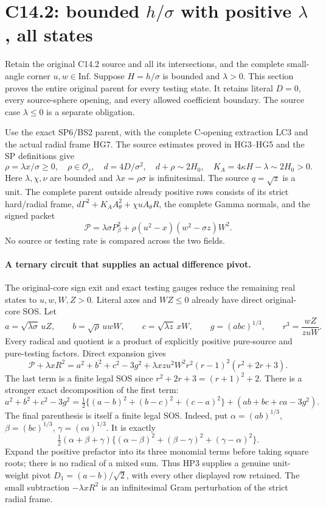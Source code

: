 \section{\texorpdfstring{C14.2: bounded $h/\sigma$ with positive $\lambda$, all states}{C14.2: bounded h/sigma with positive lambda, all states}}
\label{component:p021ed4a9e0db}

\label{p021ed4a9e0db:sec:r19-c142-positive-lambda}

Retain the original C14.2 source and all its intersections, and the
complete small-angle corner $u,w\in\mathrm{Inf}$.  Suppose
$H=h/\sigma$ is bounded and $\lambda>0$.  This section proves the
entire original parent for every testing state.  It retains literal
$D=0$, every source-sphere opening, and every allowed coefficient
boundary.  The source case $\lambda\le0$ is a separate obligation.

Use the exact SP6/BS2 parent, with the complete C-opening extraction
LC3 and the actual radial frame HG7.  The source estimates proved
in HG3--HG5 and the SP definitions give
\[
 \rho=\lambda x/\sigma\ge0,\quad \rho\in\mathcal O_c,
 \quad d=4D/\sigma^2,\quad
 d+\rho\sim2H_0,
 \quad K_A=4\kappa H-\lambda\sim2H_0>0.
 \tag{HP1}
\]
Here $\lambda,\chi,\nu$ are bounded and $\lambda x=\rho\sigma$
is infinitesimal.  The source $q=\sqrt z$ is a unit.  The complete
parent outside already positive rows consists of its strict hard/radial
frame, $d\Gamma^2+K_A A_\theta^2+\chi uA_\theta R$, the complete
Gamma normals, and the signed packet
\[
 \mathscr P=\lambda\sigma P_\beta^2+
      \rho(u^2-x)(w^2-\sigma z)W^2.
 \tag{HP2}
\]
No source or testing rate is compared across the two fields.

\paragraph{A ternary circuit that supplies an actual difference pivot.}
The original-core sign exit and exact testing gauges reduce the
remaining real states to $u,w,W,Z>0$.  Literal axes and $WZ\le0$
already have direct original-core SOS.  Let
\[
 a=\sqrt{\lambda\sigma}\,uZ,\qquad
 b=\sqrt\rho\,uwW,\qquad
 c=\sqrt{\lambda z}\,xW,\qquad g=(abc)^{1/3},
 \qquad r^3=\frac{wZ}{zuW}.
\]
Every radical and quotient is a product of explicitly positive
pure-source and pure-testing factors.  Direct expansion gives
\[
 \boxed{\quad
 \mathscr P+\lambda xR^2
 =a^2+b^2+c^2-3g^2
  +\lambda xzu^2W^2 r^2(r-1)^2(r^2+2r+3).
 \quad} \tag{HP3}
\]
The last term is a finite legal SOS since $r^2+2r+3=(r+1)^2+2$.
There is a stronger exact decomposition of the first term:
\[
 a^2+b^2+c^2-3g^2
 =\tfrac12\{(a-b)^2+(b-c)^2+(c-a)^2\}
       +(ab+bc+ca-3g^2).
 \tag{HP4}
\]
The final parenthesis is itself a finite legal SOS.  Indeed, put
$\alpha=(ab)^{1/3}$, $\beta=(bc)^{1/3}$,
$\gamma=(ca)^{1/3}$.  It is exactly
\[
 \tfrac12(\alpha+\beta+\gamma)
    \{(\alpha-\beta)^2+(\beta-\gamma)^2+(\gamma-\alpha)^2\}.
 \tag{HP5}
\]
Expand the positive prefactor into its three monomial terms before
taking square roots; there is no radical of a mixed sum.  Thus HP3
supplies a genuine unit-weight pivot
$D_1=(a-b)/\sqrt2$, with every other displayed row retained.
The small subtraction $-\lambda xR^2$ is an infinitesimal Gram
perturbation of the strict radial frame.

